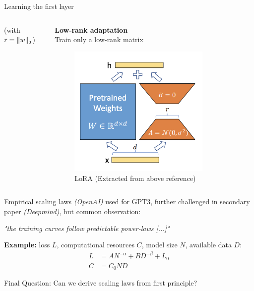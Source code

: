 \documentclass[10pt]{beamer}
\begin{document}
\begin{frame}{Learning the first layer}
\begin{columns}[T]
\begin{column}{0.5\textwidth}
\begin{block}{}
          (with $r=\left\lVert w\right\rVert_2$)
        \end{block}
    \end{column}
    \begin{column}{0.54\textwidth}
      \begin{block}{}
        \textbf{Low-rank adaptation} \cite{hu2021lora}\\
        Train only a low-rank matrix
        \vspace*{-0.3cm}
        \begin{figure}
          \centering
          \includegraphics[width=0.8\textwidth]{images/lora.white.png}
          \vspace*{-0.3cm}
          \caption{LoRA (Extracted from above reference)}
        \end{figure}
      \end{block}
    \end{column}
  \end{columns}

\end{frame}

\begin{frame}{Empirical scaling laws}
  \cite{kaplan2020scaling} \emph{(OpenAI)} used for GPT3, further challenged in secondary paper \cite{hoffmann2022training} \emph{(Deepmind)}, but common observation:

  \begin{center}
    \emph{"the training curves follow predictable power-laws [...]"}
  \end{center}  

  \textbf{Example:} loss $L$, computational resources $C$,  model size $N$, available data $D$:
  \begin{align*}
    L & = A N^{-\alpha} + B D^{-\beta} + L_0\\
    C & = C_0 N D
  \end{align*}
  
  \begin{alertblock}{Final Question:}
    Can we derive scaling laws from first principle?
  \end{alertblock}
\end{frame}
\end{document}
